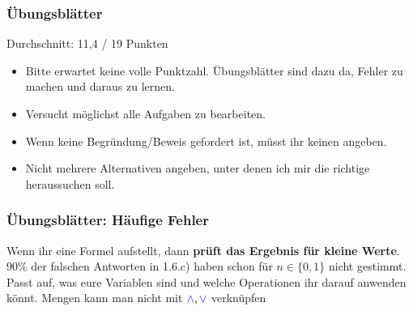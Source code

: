 





\graphicspath{{../figures/}}



\begin{frame}
	\frametitle{Übungsblätter}
	
	Durchschnitt: 11,4 / 19 Punkten
	
	\begin{itemize}
		\item Bitte erwartet keine volle Punktzahl. Übungsblätter sind dazu da, Fehler zu machen und daraus zu lernen.\\
		\item Versucht möglichst alle Aufgaben zu bearbeiten.\\
		\item Wenn keine Begründung/Beweis gefordert ist, müsst ihr keinen angeben.\\
		\item Nicht mehrere Alternativen angeben, unter denen ich mir die richtige heraussuchen soll.
	\end{itemize}
	
	
\end{frame}

\begin{frame}
	\frametitle{Übungsblätter: Häufige Fehler}
	
	\begin{itemize}
	\end{itemize}

	\pause[9]
	Wenn ihr eine Formel aufstellt, dann \textbf{prüft das Ergebnis für kleine Werte}.\\[0.2em]
	$90 \% $ der falschen Antworten in 1.6.c) haben schon für $n \in \{0, 1\}$ nicht gestimmt.\\[0.5em]
	
	\pause[10]
	Passt auf, was eure Variablen sind und welche Operationen ihr darauf anwenden könnt. Mengen kann man nicht mit $\textcolor{blue}{\wedge}\text{}, \textcolor{blue}{\vee}\text{}$ verknüpfen
\end{frame}

